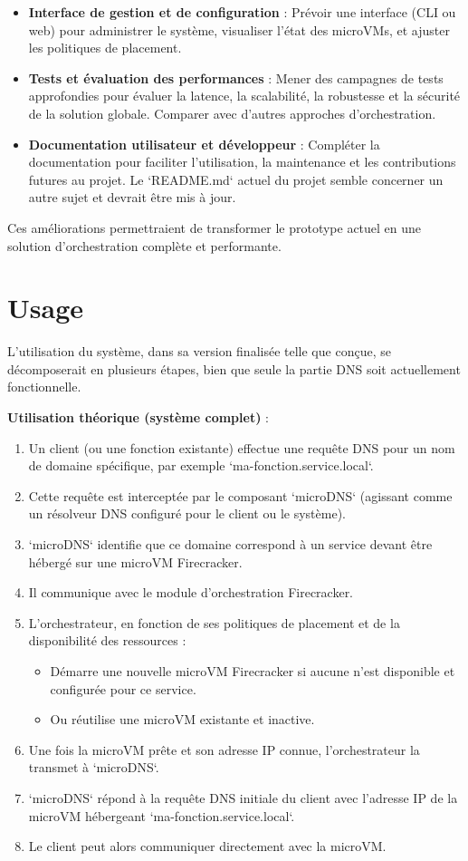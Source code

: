 \documentclass[12pt]{article}
\begin{document}
\begin{itemize}
\begin{itemize}
        \end{itemize}
    \item \textbf{Interface de gestion et de configuration} : Prévoir une interface (CLI ou web) pour administrer le système, visualiser l'état des microVMs, et ajuster les politiques de placement.
    \item \textbf{Tests et évaluation des performances} : Mener des campagnes de tests approfondies pour évaluer la latence, la scalabilité, la robustesse et la sécurité de la solution globale. Comparer avec d'autres approches d'orchestration.
    \item \textbf{Documentation utilisateur et développeur} : Compléter la documentation pour faciliter l'utilisation, la maintenance et les contributions futures au projet. Le `README.md` actuel du projet semble concerner un autre sujet et devrait être mis à jour.
\end{itemize}
Ces améliorations permettraient de transformer le prototype actuel en une solution d'orchestration complète et performante.

\section{Usage}
L'utilisation du système, dans sa version finalisée telle que conçue, se décomposerait en plusieurs étapes, bien que seule la partie DNS soit actuellement fonctionnelle.

\textbf{Utilisation théorique (système complet)} :
\begin{enumerate}
    \item Un client (ou une fonction existante) effectue une requête DNS pour un nom de domaine spécifique, par exemple `ma-fonction.service.local`.
    \item Cette requête est interceptée par le composant `microDNS` (agissant comme un résolveur DNS configuré pour le client ou le système).
    \item `microDNS` identifie que ce domaine correspond à un service devant être hébergé sur une microVM Firecracker.
    \item Il communique avec le module d'orchestration Firecracker.
    \item L'orchestrateur, en fonction de ses politiques de placement et de la disponibilité des ressources :
        \begin{itemize}
            \item Démarre une nouvelle microVM Firecracker si aucune n'est disponible et configurée pour ce service.
            \item Ou réutilise une microVM existante et inactive.
        \end{itemize}
    \item Une fois la microVM prête et son adresse IP connue, l'orchestrateur la transmet à `microDNS`.
    \item `microDNS` répond à la requête DNS initiale du client avec l'adresse IP de la microVM hébergeant `ma-fonction.service.local`.
    \item Le client peut alors communiquer directement avec la microVM.
\end{enumerate}
\end{document}
